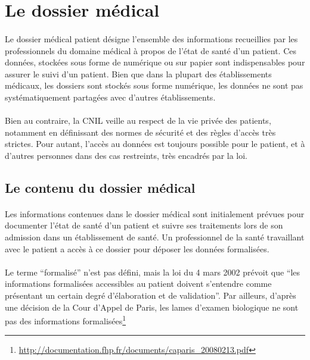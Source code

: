    \section{Le dossier médical}


\paragraph{}
Le dossier médical patient désigne l'ensemble des informations recueillies par
les professionnels du domaine médical à propos de l'état de santé d'un patient.
Ces données, stockées sous forme de numérique ou sur papier sont indispensables
pour assurer le suivi d'un patient. Bien que dans la plupart des établissements
médicaux, les dossiers sont stockés sous forme numérique, les données ne sont
pas systématiquement partagées avec d'autres établissements.

\paragraph{}
Bien au contraire, la CNIL veille au respect de la vie privée des patients,
notamment en définissant des normes de sécurité et des règles d'accès très
strictes. Pour autant, l'accès au données est toujours possible
pour le patient, et à d'autres personnes dans des cas restreints, très encadrés
par la loi.


        \subsection{Le contenu du dossier médical}

\paragraph{}
Les informations contenues dans le dossier médical sont initialement prévues
pour documenter l'état de santé d'un patient et suivre ses traitements lors de
son admission dans un établissement de santé.  Un professionnel de la santé
travaillant avec le patient a accès à ce dossier pour déposer les données
formalisées.

\paragraph{}
Le terme ``formalisé'' n'est pas défini, mais la loi du 4 mars 2002 prévoit que
``les informations formalisées accessibles au patient doivent s'entendre comme
présentant un certain degré d'élaboration et de validation''. Par ailleurs,
d'après une décision de la Cour d'Appel de Paris, les lames d'examen biologique
ne sont pas des informations
formalisées\footnote{\url{http://documentation.fhp.fr/documents/caparis_20080213.pdf}}


